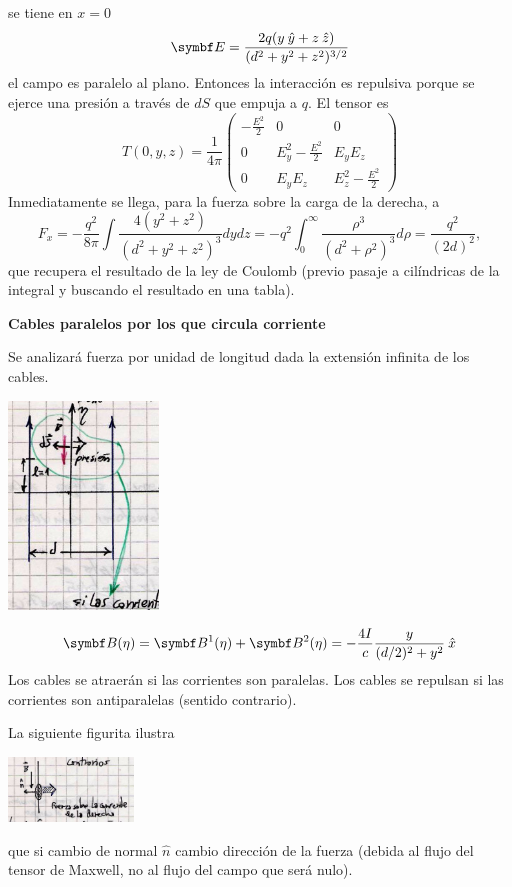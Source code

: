 \documentclass[10pt,oneside]{CBFT_book}
\begin{document}
\begin{ejemplo}{}
se tiene en $x=0$
\[
	\vb{E} = \frac{ 2 q ( y \yver + z \zver )}{( d^2 + y^2 + z^2 )^{3/2}}
\]
el campo es paralelo al plano. Entonces la interacción es repulsiva porque se ejerce una presión a
través de $dS$ que empuja a $q$. El tensor es
\[
	T(0,y,z) = \frac{1}{4\pi}\begin{pmatrix}
	        -\frac{E^2}{2} & 0 & 0 \\
		0 & E_y^2 - \frac{E^2}{2} & E_y E_z \\
		0 & E_y E_z & E_z^2 - \frac{E^2}{2} 
	\end{pmatrix}
\]
Inmediatamente se llega, para la fuerza sobre la carga de la derecha, a
\[
	F_x = - \frac{q^2}{ 8 \pi } \int \frac{ 4 ( y^2 + z^2 ) }{( d^2 + y^2 + z^2 )^3} dy dz = 
	- q^2 \int_0^\infty \frac{ \rho^3 }{(d^2 + \rho^2)^3} d\rho = 
	\frac{q^2}{(2d)^2},
\]
que recupera el resultado de la ley de Coulomb (previo pasaje a cilíndricas de la integral
y buscando el resultado en una tabla).

\end{ejemplo}

\begin{ejemplo}{\bf Cables paralelos por los que circula corriente}

Se analizará fuerza por unidad de longitud dada la extensión infinita de los cables.

\includegraphics[width=0.3\textwidth]{images/fig_ft1_cablesParalelosCorriente.jpg}

\[
	\vb{B}(\eta) = \vb{B}^1(\eta) + \vb{B}^2(\eta) = - \frac{4I}{c} \frac{y}{(d/2)^2 + y^2} \xver
\]
Los cables se atraerán si las corrientes son paralelas. Los cables se repulsan si las
corrientes son antiparalelas (sentido contrario).

La siguiente figurita  ilustra

\includegraphics[width=0.25\textwidth]{images/fig_ft1_cablesParalelosCorrienteB.jpg}

que si cambio de normal $\hat{n}$ cambio dirección de la fuerza (debida al flujo del tensor
de Maxwell, no al flujo del campo que será nulo).
 
\end{ejemplo}
\end{document}
